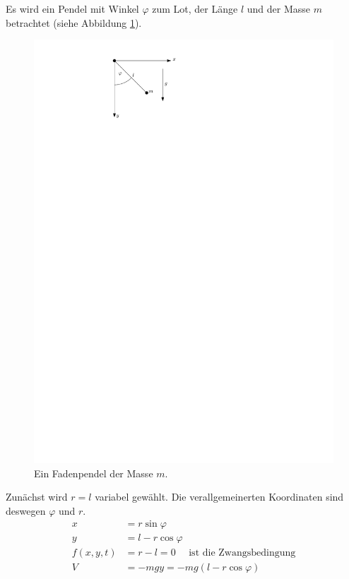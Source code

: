 \begin{beispiel*}
Es wird ein Pendel mit Winkel $\varphi$ zum Lot, der Länge $l$ und der Masse $m$ betrachtet (siehe Abbildung \ref{fig:ch1_fadenpendel}).
\begin{figure}
	\centering
	\includegraphics{figures/ch1/fadenpendel}
	\caption{Ein Fadenpendel der Masse $m$.}
	\label{fig:ch1_fadenpendel}
\end{figure}
Zunächst wird $r=l$ variabel gewählt. Die verallgemeinerten Koordinaten sind deswegen $\varphi$ und $r$.
\begin{align*}
x &= r \sin \varphi\\
y &= l - r \cos \varphi\\
f(x,y,t) &= r - l = 0 \text{~~~~ist die Zwangsbedingung}\\
V &= -mg y = -mg (l -r \cos \varphi)\\

\end{align*}
\end{beispiel*}
